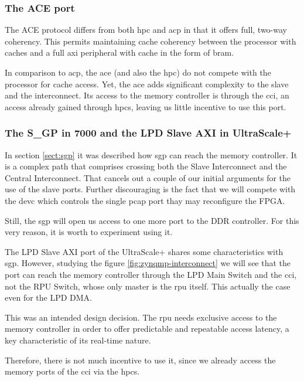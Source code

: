 \subsubsection{The ACE port}

The ACE protocol differs from both \gls{hpc} and \gls{acp} 
in that it offers full, two-way coherency. This permits
maintaining cache coherency between the processor with caches and a
full \gls{axi} peripheral with cache in the form of \gls{bram}.

In comparison to \gls{acp}, the \gls{ace} (and also the \gls{hpc}) do not compete
with the processor for cache access. 
Yet, the \gls{ace} adds significant complexity to the slave and the interconnect.
Its access to the memory controller is through the \gls{cci}, an access already
gained through \glspl{hpc}, leaving us little incentive to use this port.

\subsubsection{The S\_GP in 7000 and the LPD Slave AXI in UltraScale+}

In section \ref{sect:sgp} it was described how \gls{sgp} can reach the memory controller.
It is a complex path that comprises crossing both the Slave Interconnect and the Central
Interconnect. That cancels out a couple of our initial arguments for the use of the slave ports.
Further discouraging is the fact that we will compete 
with the \gls{devc} which controls the single \gls{pcap}
port thay may reconfigure the FPGA.

Still, the \gls{sgp} will open us access to one more port to the DDR controller.
For this very reason, it is worth to experiment using it.

The LPD Slave AXI port of the UltraScale+ shares some characteristics with \gls{sgp}.
However, studying the figure \ref{fig:zynqmp-interconnect} we will see that the port
can reach the memory controller through the LPD Main Switch and the \gls{cci},
not the RPU Switch, whose only master is the \gls{rpu} itself.
This actually the case even for the LPD DMA.

This was an intended design decision. The \gls{rpu} needs exclusive access to the
memory controller in order to offer predictable and repeatable access latency,
a key characteristic of its real-time nature.

Therefore, there is not much incentive to use it, since we already access the
memory ports of the \gls{cci} via the \glspl{hpc}.

